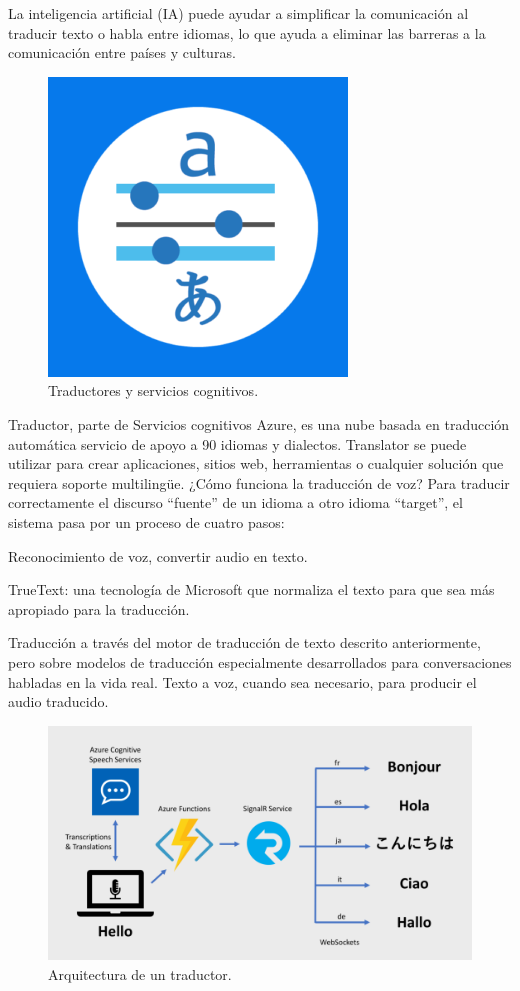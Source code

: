 La inteligencia artificial (IA) puede ayudar a simplificar la comunicación al traducir texto o habla entre idiomas, lo que ayuda a eliminar las barreras a la comunicación entre países y culturas.

\begin{figure}[htbp]
\centerline{\includegraphics[width = 0.5 \textwidth]{fig37.png}}
\caption{Traductores y servicios cognitivos.}
\label{fig37}
\end{figure}

Traductor, parte de Servicios cognitivos Azure, es una nube basada en traducción automática servicio de apoyo a 90 idiomas y dialectos. Translator se puede utilizar para crear aplicaciones, sitios web, herramientas o cualquier solución que requiera soporte multilingüe.
¿Cómo funciona la traducción de voz?
Para traducir correctamente el discurso “fuente” de un idioma a otro idioma “target”, el sistema pasa por un proceso de cuatro pasos:

Reconocimiento de voz, convertir audio en texto.

TrueText: una tecnología de Microsoft que normaliza el texto para que sea más apropiado para la traducción.

Traducción a través del motor de traducción de texto descrito anteriormente, pero sobre modelos de traducción especialmente desarrollados para conversaciones habladas en la vida real.
Texto a voz, cuando sea necesario, para producir el audio traducido.

\begin{figure}[htbp]
\centerline{\includegraphics[width = 0.5 \textwidth]{fig32.png}}
\caption{Arquitectura de un traductor.}
\label{fig32}
\end{figure}

